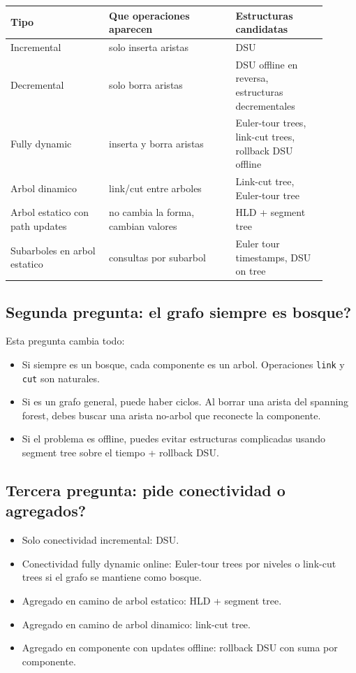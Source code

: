 \documentclass[10pt]{article}
\begin{document}
\begin{center}
\begin{tabular}{p{0.28\linewidth}p{0.36\linewidth}p{0.26\linewidth}}
\toprule
Tipo & Que operaciones aparecen & Estructuras candidatas \\
\midrule
Incremental & solo inserta aristas & DSU \\
Decremental & solo borra aristas & DSU offline en reversa, estructuras decrementales \\
Fully dynamic & inserta y borra aristas & Euler-tour trees, link-cut trees, rollback DSU offline \\
Arbol dinamico & link/cut entre arboles & Link-cut tree, Euler-tour tree \\
Arbol estatico con path updates & no cambia la forma, cambian valores & HLD + segment tree \\
Subarboles en arbol estatico & consultas por subarbol & Euler tour timestamps, DSU on tree \\
\bottomrule
\end{tabular}
\end{center}

\subsection{Segunda pregunta: el grafo siempre es bosque?}
Esta pregunta cambia todo:
\begin{itemize}[leftmargin=*]
\item Si siempre es un bosque, cada componente es un arbol. Operaciones
\texttt{link} y \texttt{cut} son naturales.
\item Si es un grafo general, puede haber ciclos. Al borrar una arista del
spanning forest, debes buscar una arista no-arbol que reconecte la componente.
\item Si el problema es offline, puedes evitar estructuras complicadas usando
segment tree sobre el tiempo + rollback DSU.
\end{itemize}

\subsection{Tercera pregunta: pide conectividad o agregados?}
\begin{itemize}[leftmargin=*]
\item Solo conectividad incremental: DSU.
\item Conectividad fully dynamic online: Euler-tour trees por niveles o link-cut
trees si el grafo se mantiene como bosque.
\item Agregado en camino de arbol estatico: HLD + segment tree.
\item Agregado en camino de arbol dinamico: link-cut tree.
\item Agregado en componente con updates offline: rollback DSU con suma por
componente.
\end{itemize}
\end{document}
